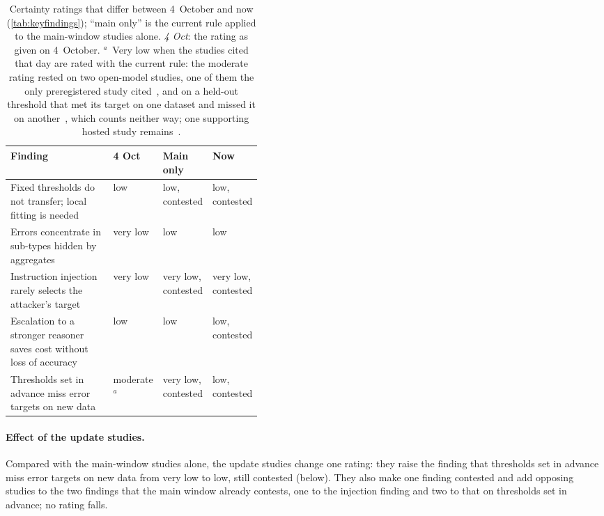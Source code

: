 \begin{table}[!htbp]
\centering
\small
\caption{Certainty ratings that differ between 4~October and now (\cref{tab:keyfindings}); ``main only'' is the current rule applied to the main-window studies alone. \emph{4 Oct}: the rating as given on 4~October. $^{a}$~Very low when the studies cited that day are rated with the current rule: the moderate rating rested on two open-model studies, one of them the only preregistered study cited~\cite{arx33843,zen23041163}, and on a held-out threshold that met its target on one dataset and missed it on another~\cite{arx00346}, which counts neither way; one supporting hosted study remains~\cite{arx33401}.}
\label{tab:certchanges}
\begin{tabular}{@{}p{0.42\linewidth}lll@{}}
\toprule
Finding & 4 Oct & Main only & Now \\
\midrule
Fixed thresholds do not transfer; local fitting is needed & low & low, contested & low, contested \\
Errors concentrate in sub-types hidden by aggregates & very low & low & low \\
Instruction injection rarely selects the attacker's target & very low & very low, contested & very low, contested \\
Escalation to a stronger reasoner saves cost without loss of accuracy & low & low & low, contested \\
Thresholds set in advance miss error targets on new data & moderate$^{a}$ & very low, contested & low, contested \\
\bottomrule
\end{tabular}
\end{table}

\paragraph{Effect of the update studies.}
Compared with the main-window studies alone, the update studies change one rating: they raise the finding that thresholds set in advance miss error targets on new data from very low to low, still contested (below). They also make one finding contested and add opposing studies to the two findings that the main window already contests, one to the injection finding and two to that on thresholds set in advance; no rating falls.


